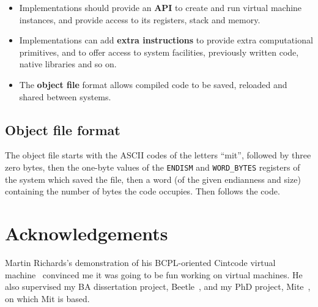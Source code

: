 \documentclass[a4paper]{article}
\begin{document}
\begin{itemize}
\item Implementations should provide an \textbf{API} to create and run virtual machine instances, and provide access to its registers, stack and memory.
\item Implementations can add \textbf{extra instructions} to provide extra computational primitives, and to offer access to system facilities, previously written code, native libraries and so on.
\item The \textbf{object file} format allows compiled code to be saved, reloaded and shared between systems.
\end{itemize}


\subsection{Object file format}
\label{object}

The object file starts with the ASCII codes of the letters
``mit'', followed by three zero bytes, then the one-byte values of
the {\tt ENDISM} and {\tt WORD\_BYTES} registers of the system which saved the file, then a word (of the given endianness and size) containing the number of bytes the code occupies. Then follows the code.


\section*{Acknowledgements}

Martin Richards's demonstration of his BCPL-oriented Cintcode virtual machine~\cite{cintweb}
convinced me it was going to be fun working on virtual machines. He also supervised my BA dissertation project, Beetle~\cite{beetledis}, and my PhD project, Mite~\cite{mite0}, on which Mit is based.



\end{document}
